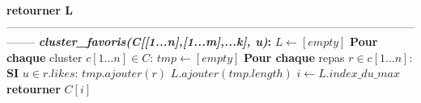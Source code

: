 \documentclass[11pt]{article}
\begin{document}
\begin{algorithm}
\begin{algorithmic}[1]
        \State \hspace{0.5cm} \textbf{retourner L}
        \\
--------------------------------------------------------------------------------------------------------------------
        \State \textbf{\textit{cluster\_favoris(C[[1...n],[1...m],...k], u)}:}
        \State \hspace{0.5cm} $L \leftarrow [empty]$
        \State \hspace{0.5cm} \textbf{Pour chaque} cluster $c[1...n] \in C$:
        \State \hspace{1cm} $tmp \leftarrow [empty]$
        \State \hspace{1cm} \textbf{Pour chaque} repas $r \in c[1...n]$: 
        \State \hspace{2cm} \textbf{SI} $u \in r.likes$:
        \State \hspace{2.5cm} $tmp.ajouter(r)$
        \State \hspace{1cm} $L.ajouter(tmp.length)$
        \State \hspace{0.5cm} $i \leftarrow L.index\_du\_max$
        \State \hspace{0.5cm} \textbf{retourner} $C[i]$
    \end{algorithmic}
\end{algorithm}
\end{document}
